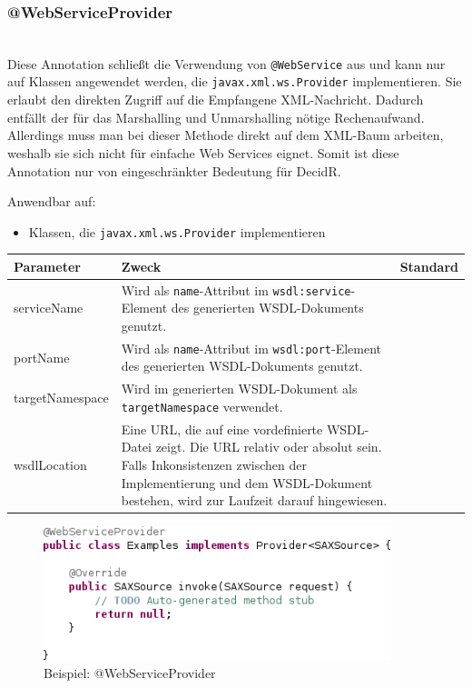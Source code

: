\documentclass[runningheads]{llncs}
\newcommand{\germanquote}[1]{\glqq{}#1\grqq{}}
\newcommand{\decidr}{DecidR}
\newcommand{\anntabwidth}{\textwidth}
\begin{document}
    \subsubsection{@WebServiceProvider}\ \\
      \nocite{impl_wsprov}
      Diese Annotation schließt die Verwendung von \texttt{@WebService} aus und kann nur auf
      Klassen angewendet werden, die \texttt{javax.xml.ws.Provider} implementieren. Sie erlaubt den
      direkten Zugriff auf die Empfangene XML-Nachricht. Dadurch entfällt der für das Marshalling
      und Unmarshalling nötige Rechenaufwand. Allerdings muss man bei dieser Methode direkt auf dem
      XML-Baum arbeiten, weshalb sie sich nicht für einfache Web Services eignet. Somit ist diese
      Annotation nur von eingeschränkter Bedeutung für \decidr{}.

      \noindent{}Anwendbar auf:
      \begin{itemize}
       \item Klassen, die \texttt{javax.xml.ws.Provider} implementieren\vfill
      \end{itemize}
      \tymin=75pt
    \begin{tabulary}{\anntabwidth}{|l|L|L|}
    \hline
    \textbf{Parameter} & \textbf{Zweck} & \textbf{Standard} \\
    \hline
      serviceName &
      Wird als \texttt{name}-Attribut im \texttt{wsdl:service}-Element des generierten
      WSDL-\linebreak[0]Dokuments genutzt. &
      \germanquote{} \\
    \hline
      portName &
      Wird als \texttt{name}-Attribut im \texttt{wsdl:port}-Element des generierten
      WSDL-\linebreak[0]Dokuments genutzt. &
      \germanquote{} \\
    \hline
      targetNamespace &
      Wird im generierten WSDL-Dokument als \texttt{targetNamespace} verwendet. &
      \germanquote{} \\
    \hline
      wsdlLocation &
      Eine URL, die auf eine vordefinierte WSDL-Datei zeigt. Die URL relativ oder absolut sein.
      Falls Inkonsistenzen zwischen der Implementierung und dem WSDL-Dokument bestehen, wird zur
      Laufzeit darauf hingewiesen. &
      \germanquote{} \\
    \hline
    \end{tabulary} \vfill
    \tymin=10pt
    \begin{figure}[ht!]
      \centering
      \includegraphics[width=0.9\textwidth]{../images/AtWebServiceProvider.png}
      \caption{Beispiel: @WebServiceProvider}
      \label{fig:wsp}
    \end{figure}
\end{document}
